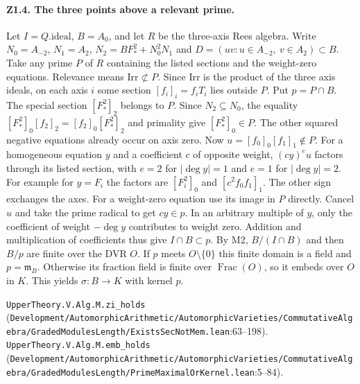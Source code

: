 \paragraph{Z1.4. The three points above a relevant prime.}
Let $I=Q.\mathrm{ideal}$, $B=A_0$, and let $R$ be the three-axis Rees algebra.
Write $N_0=A_{-2}$, $N_1=A_2$, $N_2=BF_*^2+N_0^2N_1$ and
$D=(uv:u\in A_{-2},\ v\in A_2)\subset B$.
Take any prime $P$ of $R$ containing the listed sections and the weight-zero equations.
Relevance means $\mathrm{Irr}\not\subset P$. Since $\mathrm{Irr}$ is the product of the
three axis ideals, on each axis $i$ some section $[f_i]_i=f_iT_i$ lies outside $P$.
Put $p=P\cap B$. The special section $[F_*^2]_2$ belongs to $P$.
Since $N_2\subseteq N_0$, the equality
$[F_*^2]_0[f_2]_2=[f_2]_0[F_*^2]_2$ and primality give $[F_*^2]_0\in P$.
The other squared negative equations already occur on axis zero.
Now $u=[f_0]_0[f_1]_1\notin P$. For a homogeneous equation $y$ and a coefficient $c$
of opposite weight, $(cy)^e u$ factors through its listed section, with $e=2$ for
$|\deg y|=1$ and $e=1$ for $|\deg y|=2$. For example for $y=F_i$ the factors
are $[F_i^2]_0$ and $[c^2 f_0 f_1]_1$. The other sign exchanges the axes.
For a weight-zero equation use its image in $P$ directly. Cancel $u$ and take the
prime radical to get $cy\in p$. In an arbitrary multiple of $y$, only the coefficient
of weight $-\deg y$ contributes to weight zero. Addition and multiplication of
coefficients thus give $I\cap B\subset p$. By M2, $B/(I\cap B)$ and then
$B/p$ are finite over the DVR $O$. If $p$ meets $O\setminus\{0\}$ this finite domain
is a field and $p=\mathfrak m_B$. Otherwise its fraction field is finite over
$\operatorname{Frac}(O)$, so it embeds over $O$ in $K$. This yields $\sigma:B\to K$
with kernel $p$.
\par{\footnotesize \nolinkurl{UpperTheory.V.Alg.M.zi_holds} (\nolinkurl{Development/AutomorphicArithmetic/AutomorphicVarieties/CommutativeAlgebra/GradedModulesLength/ExistsSecNotMem.lean}\allowbreak:63--198). \nolinkurl{UpperTheory.V.Alg.M.emb_holds} (\nolinkurl{Development/AutomorphicArithmetic/AutomorphicVarieties/CommutativeAlgebra/GradedModulesLength/PrimeMaximalOrKernel.lean}\allowbreak:5--84).\par}

